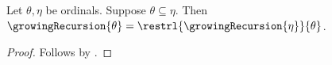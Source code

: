 \begin{theorem}\label{growing_recursion_segment}
    Let $\theta,\eta$ be ordinals.
    Suppose $\theta\subseteq\eta$.
    Then $\growingRecursion{\theta}
        =\restrl{\growingRecursion{\eta}}{\theta}$.
\end{theorem}
\begin{proof}
    Follows by
        .
\end{proof}
